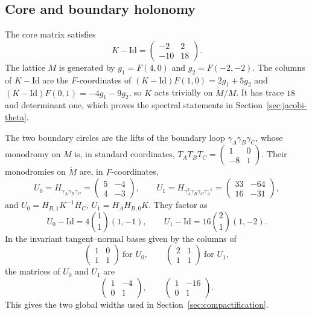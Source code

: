\subsection{Core and boundary holonomy}

The core matrix satisfies
\[
 K-\mathrm{Id}=\begin{pmatrix}-2&2\\-10&18\end{pmatrix}.
\]
The lattice $M$ is generated by $g_1=F(4,0)$ and $g_2=F(-2,-2)$.  The
columns of $K-\mathrm{Id}$ are the $F$-coordinates of
$(K-\mathrm{Id})F(1,0)=2g_1+5g_2$ and $(K-\mathrm{Id})F(0,1)=-4g_1-9g_2$,
so $K$ acts trivially on $\widetilde M/M$.  It has trace
$18$ and determinant one, which proves the spectral statements in
Section~\ref{sec:jacobi-theta}.

The two boundary circles are the lifts of the boundary loop
$\gamma_A\gamma_B\gamma_C$, whose monodromy on $M$ is, in standard
coordinates, $T_AT_BT_C=\begin{pmatrix}1&0\\-8&1\end{pmatrix}$.  Their
monodromies on $\widetilde M$ are, in $F$-coordinates,
\begin{equation}\label{eq:boundary-matrices-app}
 U_0=H_{\gamma_A\gamma_B\gamma_C}=\begin{pmatrix}5&-4\\4&-3\end{pmatrix},
 \qquad
 U_1=H_{\gamma_A^2\gamma_B\gamma_C\gamma_A^{-1}}
 =\begin{pmatrix}33&-64\\16&-31\end{pmatrix},
\end{equation}
and $U_0=H_{B,1}K^{-1}H_C$, $U_1=H_AH_{B,0}K$.  They factor as
\[
 U_0-\mathrm{Id}=4\binom11(1,-1),
 \qquad
 U_1-\mathrm{Id}=16\binom21(1,-2).
\]
In the invariant tangent--normal bases given by the columns of
\[
 \begin{pmatrix}1&0\\1&1\end{pmatrix}\ \text{for }U_0,
 \qquad
 \begin{pmatrix}2&1\\1&1\end{pmatrix}\ \text{for }U_1,
\]
the matrices of $U_0$ and $U_1$ are
\[
 \begin{pmatrix}1&-4\\0&1\end{pmatrix},
 \qquad
 \begin{pmatrix}1&-16\\0&1\end{pmatrix}.
\]
This gives the two global widths used in Section~\ref{sec:compactification}.

